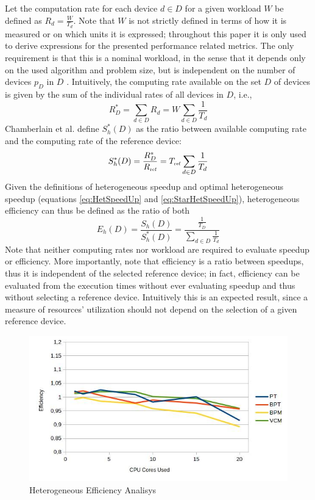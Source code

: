 Let the computation rate for each device $d \in D$ for a given workload $W$ be defined as $R_d = \frac{W}{T_d}$. Note that $W$ is not strictly defined in terms of how it is measured or on which units it is expressed; throughout this paper it is only used to derive expressions for the presented performance related metrics. The only requirement is that this is a nominal workload, in the sense that it depends only on the used algorithm and problem size, but is independent on the number of devices $p_D$ in $D$ \cite[p.~23]{Hockney96}. Intuitively, the computing rate available on the set $D$ of devices is given by the sum of the individual rates of all devices in $D$, i.e.,
\begin{equation}
R^*_D = \sum_{d \in D} R_d = W \sum_{d \in D} \frac{1}{T_d}
\label{eq:StarCapacity}
\end{equation}
Chamberlain et al. \cite{Chamberlain98} define $S_h^*(D)$ as the ratio between available computing rate and the computing rate of the reference device:
\begin{equation}
S^*_h(D) = \frac{R^*_D}{R_{\mbox{\tiny ref}}} = T_{\mbox{\tiny ref}} \sum_{d \in D} \frac{1}{T_d}
\label{eq:StarHetSpeedUp}
\end{equation}
Given the definitions of heterogeneous speedup and optimal heterogeneous speedup (equations \ref{eq:HetSpeedUp} and \ref{eq:StarHetSpeedUp}), heterogeneous efficiency can thus be defined as the ratio of both
\begin{equation}
E_h(D) = \frac{S_h(D)}{S_h^*(D)} = \frac{\frac{1}{T_D}}{\sum_{d \in D} \frac{1}{T_d}}
\label{eq:HetEff}
\end{equation}
Note that neither computing rates nor workload are required to evaluate speedup or efficiency. More importantly, note that efficiency is a ratio between speedups, thus it is independent of the selected reference device; in fact, efficiency can be evaluated from the execution times without ever evaluating speedup and thus without selecting a reference device. Intuitively this is an expected result, since a measure of resources' utilization should not depend on the selection of a given reference device.

\begin{figure}[H]
\centering
\includegraphics[width=0.8\linewidth]{img/hefficiency.jpg}
\caption{\label{img:efficiency} Heterogeneous Efficiency Analisys}
\end{figure}

